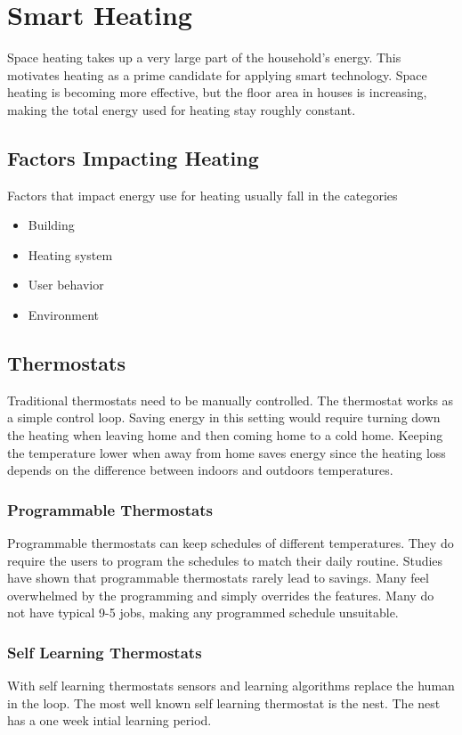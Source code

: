 \section{Smart Heating}
Space heating takes up a very large part of the household's energy.
This motivates heating as a prime candidate for applying smart technology.
Space heating is becoming more effective, but the floor area in houses is increasing, making the total energy used for heating stay roughly constant.

\subsection{Factors Impacting Heating}
Factors that impact energy use for heating usually fall in the categories

\begin{itemize}
    \item Building
    \item Heating system
    \item User behavior
    \item Environment
\end{itemize}

\subsection{Thermostats}
Traditional thermostats need to be manually controlled.
The thermostat works as a simple control loop.
Saving energy in this setting would require turning down the heating when leaving home and then coming home to a cold home.
Keeping the temperature lower when away from home saves energy since the heating loss depends on the difference between indoors and outdoors temperatures. \\

\subsubsection{Programmable Thermostats}
Programmable thermostats can keep schedules of different temperatures.
They do require the users to program the schedules to match their daily routine.
Studies have shown that programmable thermostats rarely lead to savings.
Many feel overwhelmed by the programming and simply overrides the features.
Many do not have typical 9-5 jobs, making any programmed schedule unsuitable.

\subsubsection{Self Learning Thermostats}
With self learning thermostats sensors and learning algorithms replace the human in the loop.
The most well known self learning thermostat is the nest.
The nest has a one week intial learning period.\\


